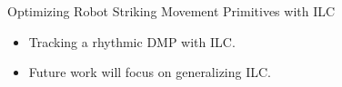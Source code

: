 \documentclass[handout]{beamer}
\begin{document}
\begin{frame}{Optimizing Robot Striking Movement Primitives with ILC}
\begin{itemize}
\item Tracking a rhythmic DMP with ILC.
\item Future work will focus on generalizing ILC.
\end{itemize}
\begin{figure}[ht]
\centering
{}
\label{Robot experiment} 
\end{figure}
\end{frame}
%
\end{document}
